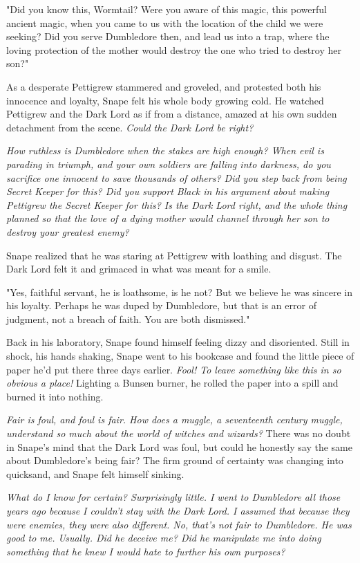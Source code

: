 \documentclass[a4paper,11pt]{article}
\begin{document}
"Did you know this, Wormtail? Were you aware of this magic, this powerful ancient magic, when you came to us with the location of the child we were seeking? Did you serve Dumbledore then, and lead us into a trap, where the loving protection of the mother would destroy the one who tried to destroy her son?"

As a desperate Pettigrew stammered and groveled, and protested both his innocence and loyalty, Snape felt his whole body growing cold. He watched Pettigrew and the Dark Lord as if from a distance, amazed at his own sudden detachment from the scene. \emph{Could the Dark Lord be right?}

\emph{How ruthless is Dumbledore when the stakes are high enough? When evil is parading in triumph, and your own soldiers are falling into darkness, do you sacrifice one innocent to save thousands of others? Did you step back from being Secret Keeper for this? Did you support Black in his argument about making Pettigrew the Secret Keeper for this? Is the Dark Lord right, and the whole thing planned so that the love of a dying mother would channel through her son to destroy your greatest enemy?}

Snape realized that he was staring at Pettigrew with loathing and disgust. The Dark Lord felt it and grimaced in what was meant for a smile.

"Yes, faithful servant, he is loathsome, is he not? But we believe he was sincere in his loyalty. Perhaps he was duped by Dumbledore, but that is an error of judgment, not a breach of faith. You are both dismissed."

Back in his laboratory, Snape found himself feeling dizzy and disoriented. Still in shock, his hands shaking, Snape went to his bookcase and found the little piece of paper he'd put there three days earlier. \emph{Fool! To leave something like this in so obvious a place!} Lighting a Bunsen burner, he rolled the paper into a spill and burned it into nothing.

\emph{Fair is foul, and foul is fair. How does a muggle, a seventeenth century muggle, understand so much about the world of witches and wizards?} There was no doubt in Snape's mind that the Dark Lord was foul, but could he honestly say the same about Dumbledore's being fair? The firm ground of certainty was changing into quicksand, and Snape felt himself sinking.

\emph{What do I know for certain? Surprisingly little. I went to Dumbledore all those years ago because I couldn't stay with the Dark Lord. I assumed that because they were enemies, they were also different. No, that's not fair to Dumbledore. He was good to me. Usually. Did he deceive me? Did he manipulate me into doing something that he knew I would hate to further his own purposes?}
\end{document}
